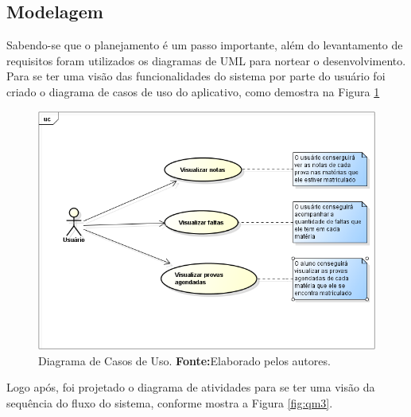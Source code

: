 \subsection{Modelagem}
\par Sabendo-se que o planejamento é um passo importante, além do levantamento
de requisitos foram utilizados os diagramas de UML para nortear o
desenvolvimento. Para se ter uma visão das funcionalidades do sistema por parte
do usuário foi criado o diagrama de casos de uso do aplicativo, como demostra
na Figura \ref{fig:qm2}
		
		\begin{figure}[h!]
			\centerline{\includegraphics[scale=0.4]{./imagens/2_q_metodologico/qm2.png}}
			\caption[Diagrama de Casos de Uso]{Diagrama de Casos de Uso.
			 \textbf{Fonte:}Elaborado pelos autores.}
			\label{fig:qm2}
		\end{figure}
		
	\par Logo após, foi projetado o diagrama de atividades para se ter uma visão
da sequência do fluxo do sistema, conforme mostra a Figura \ref{fig:qm3}.
		
